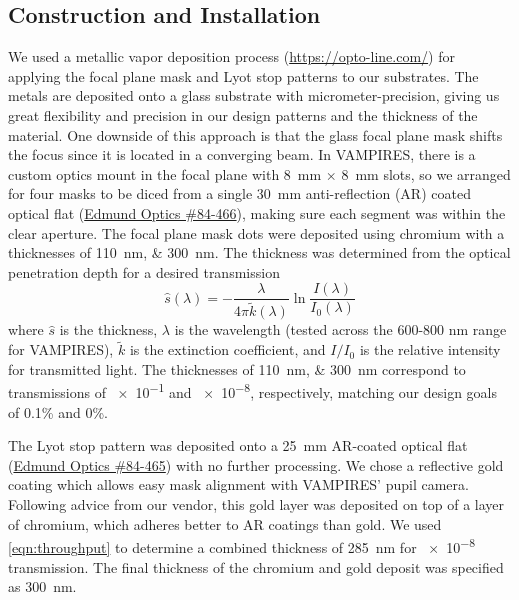 \documentclass[]{spie}  %
\begin{document}
\subsection{Construction and Installation}\label{sec:install}

We used a metallic vapor deposition process (\url{https://opto-line.com/}) for applying the focal plane mask and Lyot stop patterns to our substrates. The metals are deposited onto a glass substrate with micrometer-precision, giving us great flexibility and precision in our design patterns and the thickness of the material. One downside of this approach is that the glass focal plane mask shifts the focus since it is located in a converging beam. In VAMPIRES, there is a custom optics mount in the focal plane with \qty{8}{\milli\meter} $\times$ \qty{8}{\milli\meter} slots, so we arranged for four masks to be diced from a single \qty{30}{\milli\meter} anti-reflection (AR) coated optical flat (\href{https://www.edmundoptics.com/p/30mm-dia-4mm-thick-nir-i-coated-lambda10-fused-silica-window/27562/}{Edmund Optics \#84-466}), making sure each segment was within the clear aperture. The focal plane mask dots were deposited using chromium with a thicknesses of \qtylist{110;300}{\nano\meter}. The thickness was determined from the optical penetration depth for a desired transmission
\begin{equation}
    \hat{s}(\lambda) = -\frac{\lambda}{4\pi\tilde{k}(\lambda)}\ln{\frac{I(\lambda)}{I_0(\lambda)}}
    \label{eqn:throughput}
\end{equation}
where $\hat{s}$ is the thickness, $\lambda$ is the wavelength (tested across the 600-800 nm range for VAMPIRES), $\tilde{k}$ is the extinction coefficient, and $I/I_0$ is the relative intensity for transmitted light. The thicknesses of \qtylist{110;300}{\nano\meter} correspond to transmissions of \num{e-1} and \num{e-8}, respectively, matching our design goals of 0.1\% and 0\%.

The Lyot stop pattern was deposited onto a \qty{25}{\milli\meter} AR-coated optical flat (\href{https://www.edmundoptics.com/p/25mm-dia-3mm-thick-nir-i-coated-lambda10-fused-silica-window/27561/}{Edmund Optics \#84-465}) with no further processing. We chose a reflective gold coating which allows easy mask alignment with VAMPIRES' pupil camera. Following advice from our vendor, this gold layer was deposited on top of a layer of chromium, which adheres better to AR coatings than gold. We used \autoref{eqn:throughput} to determine a combined thickness of \qty{285}{\nano\meter} for \num{e-8} transmission. The final thickness of the chromium and gold deposit was specified as \qty{300}{\nano\meter}.
\end{document}
